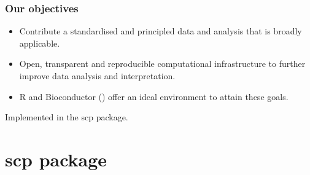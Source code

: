 \documentclass{beamer}
\newcommand{\hcode}[2][lgray]{{\ttfamily\color{vdgray}\colorbox{#1}{#2}}}
\newcommand{\frametitlesection}[1]{\frametitle{\centering #1 \footnotesize \hspace{0pt plus 1 filll} \insertsection}}
\begin{document}
\begin{frame}
    \frametitlesection{Our objectives}
  
    \begin{itemize}
    \item Contribute a standardised and principled data and analysis
      that is broadly applicable.

    \item Open, transparent and reproducible computational
      infrastructure to further improve data analysis and
      interpretation.

    \item R and Bioconductor (\citet{Huber2015-sn}) offer an ideal
      environment to attain these goals.
      
    \end{itemize}

    \bigskip
    
    Implemented in the \hcode{scp} package.

\end{frame}



\section{scp package}
\end{document}
